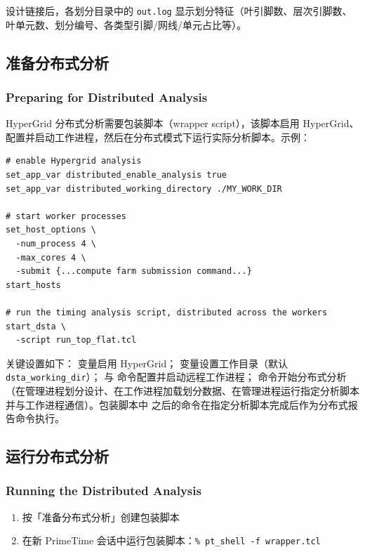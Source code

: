 设计链接后，各划分目录中的 \texttt{out.log} 显示划分特征（叶引脚数、层次引脚数、叶单元数、划分编号、各类型引脚/网线/单元占比等）。

\subsection{准备分布式分析}
\subsubsection*{Preparing for Distributed Analysis}

HyperGrid 分布式分析需要包装脚本（wrapper script），该脚本启用 HyperGrid、配置并启动工作进程，然后在分布式模式下运行实际分析脚本。示例：
\begin{lstlisting}
# enable Hypergrid analysis
set_app_var distributed_enable_analysis true
set_app_var distributed_working_directory ./MY_WORK_DIR

# start worker processes
set_host_options \
  -num_process 4 \
  -max_cores 4 \
  -submit {...compute farm submission command...}
start_hosts

# run the timing analysis script, distributed across the workers
start_dsta \
  -script run_top_flat.tcl
\end{lstlisting}

关键设置如下： 变量启用 HyperGrid；
 变量设置工作目录（默认
\texttt{dsta\_working\_dir}）； 与
 命令配置并启动远程工作进程；
命令开始分布式分析（在管理进程划分设计、在工作进程加载划分数据、在管理进程运行指定分析脚本并与工作进程通信）。包装脚本中 
之后的命令在指定分析脚本完成后作为分布式报告命令执行。

\subsection{运行分布式分析}
\subsubsection*{Running the Distributed Analysis}

\begin{enumerate}
  \item 按「准备分布式分析」创建包装脚本
  \item 在新 PrimeTime 会话中运行包装脚本：\texttt{\% pt\_shell -f wrapper.tcl}
\end{enumerate}


